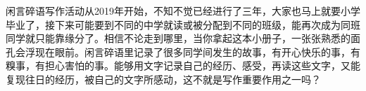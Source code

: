 \markdownRendererDocumentBegin
{}\markdownRendererInterblockSeparator
{}闲言碎语写作活动从2019年开始，不知不觉已经进行了三年，大家也马上就要小学毕业了，接下来可能要到不同的中学就读或被分配到不同的班级，能再次成为同班同学就只能靠缘分了。相信不论走到哪里，当你拿起这本小册子，一张张熟悉的面孔会浮现在眼前。闲言碎语里记录了很多同学间发生的故事，有开心快乐的事，有糗事，有担心害怕的事。能够用文字记录自己的经历、感受，再读这些文字，又能复现往日的经历，被自己的文字所感动，这不就是写作重要作用之一吗？\markdownRendererDocumentEnd